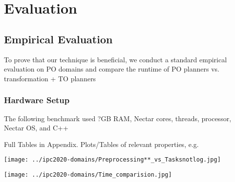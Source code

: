 \chapter{Evaluation}\label{chap:evaluation}


\section{Empirical Evaluation}
To prove that our technique is beneficial, we conduct a standard empirical evaluation on PO domains and compare the runtime of PO planners vs. transformation + TO planners





\subsection{Hardware Setup}
The following benchmark used ?GB RAM, %
Nectar cores, threads, processor, %
Nectar OS, and %
C++


Full Tables in Appendix. Plots/Tables of relevant properties, e.g.
\begin{center}
	\texttt{[image: ../ipc2020-domains/Preprocessing**\_vs\_Tasksnotlog.jpg]}
\end{center}

\begin{center}
	\texttt{[image: ../ipc2020-domains/Time\_comparision.jpg]}
\end{center}

